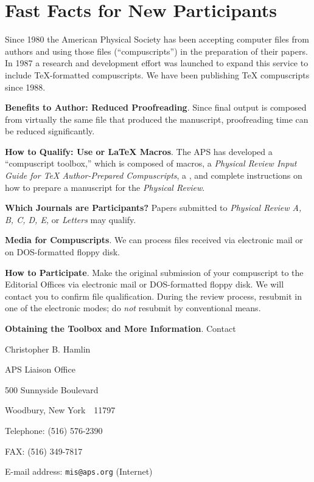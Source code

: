\nobreak
\section{Fast Facts for New Participants}
\label{sec:fastfacts}

Since 1980 the American Physical Society has been accepting computer files
from authors and using those files (``compuscripts'') in the preparation of
their papers. In 1987 a research and development effort was launched to
expand this service to include \TeX-formatted compuscripts. We have been
publishing \TeX{} compuscripts since 1988.

\medskip
{\bf Benefits to Author: Reduced Proofreading}. Since final output is
composed from virtually the same file that produced the manuscript,
proofreading time can be reduced significantly.

\medskip
{\bf How to Qualify: Use \REVTeX{} or  \LaTeX{} Macros}. The APS has
developed a ``compuscript toolbox,'' which is composed of macros, a {\em
Physical Review Input Guide for \TeX{} Author-Prepared Compuscripts}, a
\SNG{}, and complete instructions on how to prepare a manuscript for the
{\em Physical Review}.

\medskip


{\bf Which Journals are Participants?} Papers submitted to {\em Physical
Review A, B, C, D, E,} or {\em Letters\/} may qualify.

\medskip
{\bf Media for Compuscripts}. We can process files received via electronic
mail or on DOS-formatted floppy disk.

\medskip
{\bf How to Participate}.  Make the original submission of your \REVTeX{}
compuscript to the Editorial Offices via electronic mail or DOS-formatted
floppy disk. We will contact you to confirm file qualification. During the
review process, resubmit in one of the electronic modes; do {\em not\/}
resubmit by conventional means.

\medskip
{\bf Obtaining the Toolbox and More Information}. Contact

\medskip
Christopher B. Hamlin

APS Liaison Office

500 Sunnyside Boulevard

Woodbury, New York~~11797

\medskip
Telephone: (516) 576-2390

FAX: (516) 349-7817

E-mail address: {\tt mis@aps.org} (Internet)

